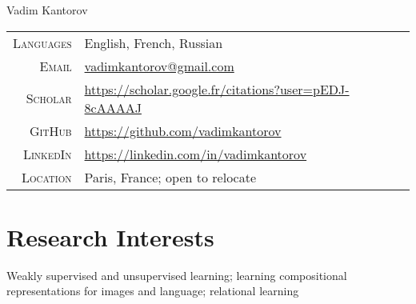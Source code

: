 \documentclass[a4paper,10pt]{article}
\begin{document}
\pagestyle{empty}

\begin{minipage}{0.72\linewidth}
\par{\Huge{Vadim Kantorov}\bigskip}\par
\begin{tabular}{rl}
    \textsc{Languages} & English, French, Russian\footnotemark\\ %
    \textsc{Email}     & \href{mailto:vadimkantorov@gmail.com}{vadimkantorov@gmail.com} \\
    \textsc{Scholar} & \href{https://scholar.google.fr/citations?user=pEDJ-8cAAAAJ}{https://scholar.google.fr/citations?user=pEDJ-8cAAAAJ} \\
    \textsc{GitHub} & \href{https://github.com/vadimkantorov}{https://github.com/vadimkantorov} \\
    \textsc{LinkedIn} & \href{https://linkedin.com/in/vadimkantorov}{https://linkedin.com/in/vadimkantorov} \\
    \textsc{Location}   & Paris, France; open to relocate \\
\end{tabular}
\end{minipage}

\bigskip\bigskip

\section{Research Interests}
Weakly supervised and unsupervised learning; learning compositional representations for images and language; relational learning
\end{document}
